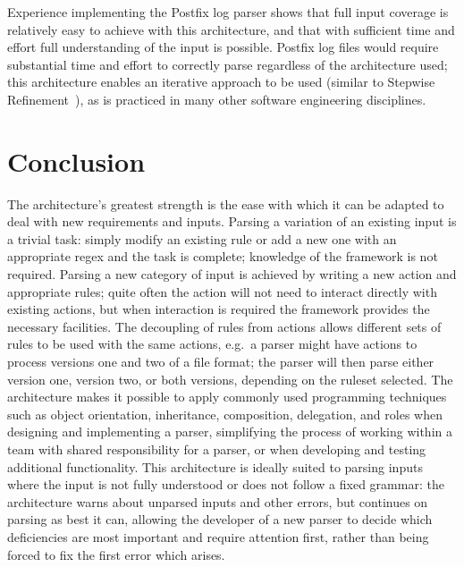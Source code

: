 \documentclass{svmult}
\begin{document}
Experience implementing the Postfix log parser shows that full input
coverage is relatively easy to achieve with this architecture, and that
with sufficient time and effort full understanding of the input is
possible.  Postfix log files would require substantial time and effort to
correctly parse regardless of the architecture used; this architecture
enables an iterative approach to be used (similar to Stepwise
Refinement~\cite{stepwise-refinement}), as is practiced in many other
software engineering disciplines.

\section{Conclusion}

The architecture's greatest strength is the ease with which it can be
adapted to deal with new requirements and inputs.  Parsing a variation of
an existing input is a trivial task: simply modify an existing rule or add
a new one with an appropriate regex and the task is complete; knowledge of
the framework is not required.  Parsing a new category
of input is achieved by writing a new action and appropriate rules; quite
often the action will not need to interact directly with existing actions,
but when interaction is required the framework provides the necessary
facilities.  The decoupling of rules from actions allows different sets of
rules to be used with the same actions, e.g.\ a parser might have actions
to process versions one and two of a file format; the parser will then
parse either version one, version two, or both versions, depending on the
ruleset selected.  The architecture makes it possible to apply commonly
used programming techniques such as object orientation, inheritance,
composition, delegation, and roles when designing and implementing a parser,
simplifying the process of working within a team with shared
responsibility for a parser, or when developing and testing additional functionality.
This architecture is ideally suited to parsing inputs where the input is
not fully understood or does not follow a fixed grammar: the architecture
warns about unparsed inputs and other errors, but continues on parsing as
best it can, allowing the developer of a new parser to decide which
deficiencies are most important and require attention first, rather than
being forced to fix the first error which arises.
\end{document}
